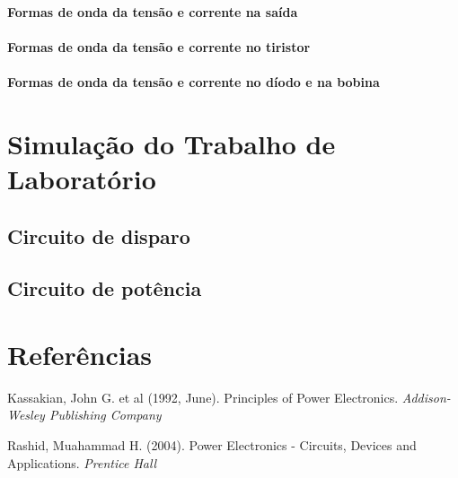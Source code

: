 \documentclass[a4paper,11pt]{article}
\numberwithin{equation}{section}
\begin{document}
\paragraph{Formas de onda da tensão e corrente na saída}


\paragraph{Formas de onda da tensão e corrente no tiristor}


\paragraph{Formas de onda da tensão e corrente no díodo e na bobina}


\section{Simulação do Trabalho de Laboratório}


\subsection{Circuito de disparo}

\subsection{Circuito de potência}

\section{Referências}

Kassakian, John G. et al (1992, June). Principles of Power Electronics. \textit{Addison-Wesley Publishing Company}

Rashid, Muahammad H. (2004). Power Electronics - Circuits, Devices and Applications. \textit{Prentice Hall}

\pagebreak
\end{document}
